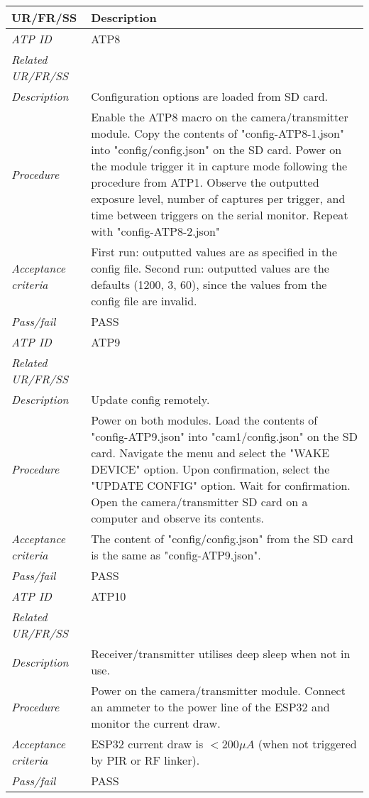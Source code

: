 \documentclass[class=report,11pt,crop=false]{standalone}
\begin{document}
\begin{table}[!ht]
    \centering
    \begin{scriptsize}
    \begin{tabularx}{\textwidth}{|p{} X|}
        
        \hline
        \textbf{UR/FR/SS} & \textbf{Description}\\ \hline

        \textit{ATP ID} & ATP8\\
        \textit{Related UR/FR/SS} & \\
        \textit{Description} & Configuration options are loaded from SD card.\\
        \textit{Procedure} & Enable the ATP8 macro on the camera/transmitter module. Copy the contents of "config-ATP8-1.json" into "config/config.json" on the SD card. Power on the module trigger it in capture mode following the procedure from ATP1. Observe the outputted exposure level, number of captures per trigger, and time between triggers on the serial monitor. Repeat with "config-ATP8-2.json" \\
        \textit{Acceptance criteria} & First run: outputted values are as specified in the config file. Second run: outputted values are the defaults (1200, 3, 60), since the values from the config file are invalid.\\ 
        \textit{Pass/fail} & PASS\\ \hline

        \textit{ATP ID} & ATP9\\
        \textit{Related UR/FR/SS} & \\
        \textit{Description} & Update config remotely.\\
        \textit{Procedure} & Power on both modules. Load the contents of "config-ATP9.json" into "cam1/config.json" on the SD card. Navigate the menu and select the "WAKE DEVICE" option. Upon confirmation, select the "UPDATE CONFIG" option. Wait for confirmation. Open the camera/transmitter SD card on a computer and observe its contents.\\
        \textit{Acceptance criteria} & The content of "config/config.json" from the SD card is the same as "config-ATP9.json".\\ 
        \textit{Pass/fail} & PASS \\ \hline

        \textit{ATP ID} & ATP10\\
        \textit{Related UR/FR/SS} & \\
        \textit{Description} & Receiver/transmitter utilises deep sleep when not in use.\\
        \textit{Procedure} & Power on the camera/transmitter module. Connect an ammeter to the power line of the ESP32 and monitor the current draw. \\
        \textit{Acceptance criteria} & ESP32 current draw is $ < 200 \mu A $ (when not triggered by PIR or RF linker).\\ 
        \textit{Pass/fail} & PASS\\ \hline


\end{tabularx}
\end{scriptsize}
\end{table}
\end{document}
